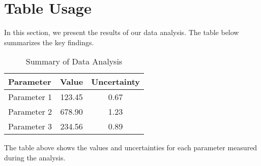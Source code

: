 \section{Table Usage}

In this section, we present the results of our data analysis. The table below summarizes the key findings.

\begin{table}[h]
\centering
\caption{Summary of Data Analysis}
\begin{tabular}{lcc}
\toprule
\textbf{Parameter} & \textbf{Value} & \textbf{Uncertainty} \\
\midrule
Parameter 1 & 123.45 & 0.67 \\
Parameter 2 & 678.90 & 1.23 \\
Parameter 3 & 234.56 & 0.89 \\
\bottomrule
\end{tabular}
\end{table}

The table above shows the values and uncertainties for each parameter measured during the analysis.
